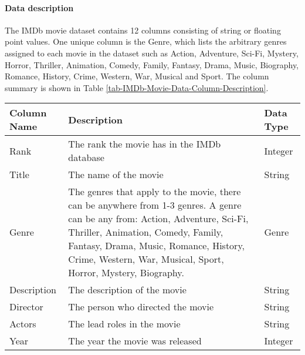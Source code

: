     \paragraph{Data description}
        The IMDb movie dataset contains 12 columns consisting of string or floating
            point values.
        One unique column is the Genre, which lists the arbitrary genres assigned to
            each movie in the dataset such as Action, Adventure, Sci-Fi, Mystery, Horror,
            Thriller, Animation, Comedy, Family, Fantasy, Drama, Music, Biography, Romance,
            History, Crime, Western, War, Musical and Sport.
        The column summary is shown in Table
            \ref*{tab-IMDb-Movie-Data-Column-Description}.
        \begin{table}[h]
            \centering
            \begin{tabular}{lp{10cm}l}
                \toprule
                Column Name        & Description                                                                & Data Type \\
                \midrule
                Rank               & The rank the movie has in the IMDb database                                & Integer   \\
                Title              & The name of the movie                                                      & String    \\
                Genre              & The genres that apply to the movie, there can be anywhere from 1-3 genres.
                A genre can be any from: Action, Adventure, Sci-Fi, Thriller, Animation,
                    Comedy, Family, Fantasy, Drama, Music, Romance, History, Crime, Western, War,
                    Musical, Sport, Horror, Mystery, Biography.
                                   & Genre                                                                                  \\
                Description        & The description of the movie                                               & String    \\
                Director           & The person who directed the movie                                          & String    \\
                Actors             & The lead roles in the movie                                                & String    \\
                Year               & The year the movie was released                                            & Integer   \\

\end{tabular}
\end{table}
